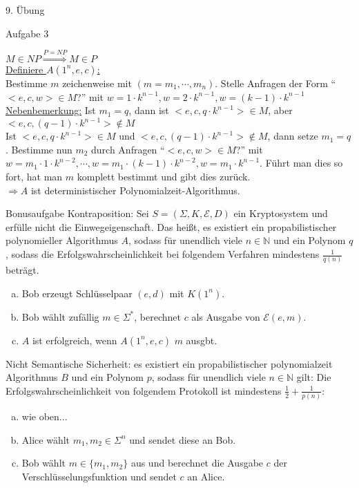 \begin{section}{9. Übung}
\begin{subsection}{Aufgabe 3}
\begin{enumerate}[]
    \end{enumerate}
   $M \in NP \overset{P = NP}{\Rightarrow} M \in P$\\
   \underline{Definiere $A(1^n,e,c)$:}\\
   Bestimme $m$ zeichenweise mit $(m = m_1, \cdots, m_n)$. Stelle Anfragen der Form ``$<e,c,w> \in M$?'' mit $w=1\cdot k^{n-1}, w= 2\cdot k^{n-1}, w = (k-1)\cdot k^{n-1}$\\
   \indent \underline{Nebenbemerkung:} Ist $m_1 = q$, dann ist $<e,c,q\cdot k^{n-1}> \in M$, aber $<e,c,(q-1)\cdot k^{n-1}> \not\in M$\\
   \noindent Ist $<e,c,q\cdot k^{n-1}>\in M$ und $<e,c,(q-1)\cdot k^{n-1}> \not\in M$, dann setze $m_1 = q$. Bestimme nun $m_2$ durch Anfragen ``$<e,c,w> \in M$?'' mit $w = m_1\cdot 1 \cdot k^{n-2}, \cdots , w = m_1 \cdot (k-1) \cdot k^{n-2}, w = m_1 \cdot k^{n-1}$. Führt man dies so fort, hat man $m$ komplett bestimmt und gibt dies zurück.\\
   $\Rightarrow A$ ist deterministischer Polynomialzeit-Algorithmus.
 \end{subsection}
 \begin{subsection}{Bonusaufgabe}
  Kontraposition: Sei $S = (\Sigma, K, \mathcal{E}, D)$ ein Kryptosystem und erfülle nicht die Einwegeigenschaft. Das heißt, es existiert ein propabilistischer polynomieller Algorithmus $A$, sodass für unendlich viele $n \in \mathbb{N}$ und ein Polynom $q$ , sodass die Erfolgswahrscheinlichkeit bei folgendem Verfahren mindestens $\frac{1}{q(n)}$ beträgt.
  \begin{enumerate}[a)]
   \item Bob erzeugt Schlüsselpaar $(e,d)$ mit $K(1^n)$.
   \item Bob wählt zufällig $m \in \Sigma^*$, berechnet $c$ als Ausgabe von $\mathcal{E}(e,m)$.
   \item $A$ ist erfolgreich, wenn $A(1^n,e,c)$ $m$ ausgbt.
  \end{enumerate}
  Nicht Semantische Sicherheit: es existiert ein propabilistischer polynomialzeit Algorithmus $B$ und ein Polynom $p$, sodass für unendlich viele $n \in \mathbb{N}$ gilt: Die Erfolgswahrscheinlichkeit von folgendem Protokoll ist mindestens $\frac{1}{2} + \frac{1}{p(n)}$:
  \begin{enumerate}[a)]
   \item wie oben...
   \item Alice wählt $m_1,m_2 \in \Sigma^n$ und sendet diese an Bob.
   \item Bob wählt $m \in \{m_1, m_2\}$ aus und berechnet die Ausgabe $c$ der Verschlüsselungsfunktion und sendet $c$ an Alice.

\end{enumerate}
\end{subsection}
\end{section}
